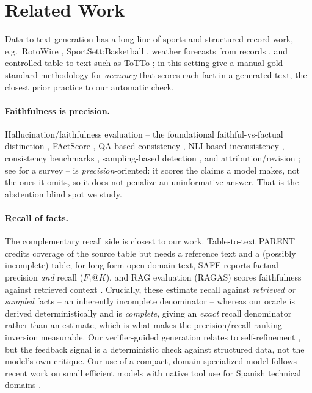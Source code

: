 \documentclass[11pt]{article}
\begin{document}
\section{Related Work}
Data-to-text generation has a long line of sports and structured-record work, e.g.\
RotoWire \citep{wiseman2017challenges}, SportSett:Basketball
\citep{thomson2020sportsett}, weather forecasts from records \citep{liang2009weather},
and controlled table-to-text such as ToTTo \citep{parikh2020totto}; in this setting
\citet{thomson2020accuracy} give a manual gold-standard methodology for \emph{accuracy}
that scores each fact in a generated text, the closest prior practice to our automatic
check.

\paragraph{Faithfulness is precision.} Hallucination/faithfulness evaluation -- the
foundational faithful-vs-factual distinction \citep{maynez2020faithfulness}, FActScore
\citep{min2023factscore}, QA-based consistency \citep{fabbri2022qafacteval}, NLI-based
inconsistency \citep{laban2022summac,kryscinski2020factcc}, consistency benchmarks
\citep{honovich2022true}, sampling-based detection \citep{manakul2023selfcheckgpt}, and
attribution/revision \citep{gao2023rarr}; see \citet{ji2023survey} for a survey -- is
\emph{precision}-oriented: it scores the claims a model makes, not the ones it omits, so it
does not penalize an uninformative answer. That is the abstention blind spot we study.

\paragraph{Recall of facts.} The complementary recall side is closest to our work.
Table-to-text PARENT \citep{dhingra2019parent} credits coverage of the source table but
needs a reference text and a (possibly incomplete) table; for long-form open-domain text,
SAFE \citep{wei2024longfact} reports factual precision \emph{and} recall ($F_1@K$), and RAG
evaluation (RAGAS) scores faithfulness against retrieved context \citep{es2024ragas}.
Crucially, these estimate recall against \emph{retrieved or sampled} facts -- an inherently
incomplete denominator -- whereas our oracle is derived deterministically and is
\emph{complete}, giving an \emph{exact} recall denominator rather than an estimate, which
is what makes the precision/recall ranking inversion measurable. Our verifier-guided
generation relates to self-refinement \citep{madaan2023selfrefine}, but the feedback signal
is a deterministic check against structured data, not the model's own critique. Our use of
a compact, domain-specialized model follows recent work on small efficient models with
native tool use for Spanish technical domains \citep{vectrayxnano2026}.
\end{document}
